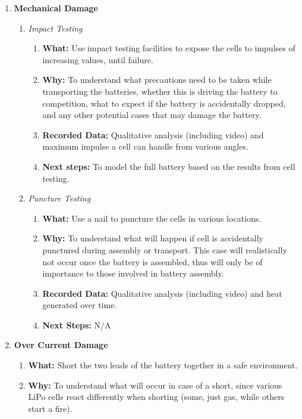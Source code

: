 \documentclass[main.tex]{subfiles}
\begin{document}
    \begin{enumerate}
        \item \textbf{Mechanical Damage}
        \begin{enumerate}
            \item \textit{Impact Testing}
            \begin{enumerate}
                \item \textbf{What: }Use impact testing facilities to expose the cells to impulses of increasing values, until failure.
                \item \textbf{Why: }To understand what precautions need to be taken while transporting the batteries, whether this is driving the battery to competition, what to expect if the battery is accidentally dropped, and any other potential cases that may damage the battery.
                \item \textbf{Recorded Data: }Qualitative analysis (including video) and maximum impulse a cell can handle from various angles.
                \item \textbf{Next steps: }To model the full battery based on the results from cell testing.
            \end{enumerate}
            \item \textit{Puncture Testing}
            \begin{enumerate}
                \item \textbf{What: }Use a nail to puncture the cells in various locations.
                \item \textbf{Why: }To understand what will happen if cell is accidentally punctured during assembly or transport. This case will realistically not occur once the battery is assembled, thus will only be of importance to those involved in battery assembly.
                \item \textbf{Recorded Data: }Qualitative analysis (including video) and heat generated over time.
                \item \textbf{Next Steps: }N/A
            \end{enumerate}
        \end{enumerate}
        \item \textbf{Over Current Damage}
        \begin{enumerate}
            \item \textbf{What: }Short the two leads of the battery together in a safe environment.
            \item \textbf{Why: }To understand what will occur in case of a short, since various LiPo cells  react differently when shorting (some, just gas, while others start a fire).

\end{enumerate}
\end{enumerate}
\end{document}
